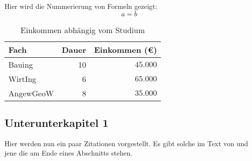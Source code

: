 	Hier wird die Nummerierung von Formeln gezeigt:
	\begin{equation}
		a=b
	\end{equation}
	
	\begin{table}
		\caption{Einkommen abhängig vom Studium}
		\label{tbl:testtest}
		\centering
		\begin{tabular}{lrr} 
			\toprule
			Fach & Dauer & Einkommen (€)\\ 
			\midrule 
			Bauing & 10 & $45.000$ \\
			WirtIng & 6 & $65.000$ \\
			AngewGeoW & 8 & $35.000$\\ 
			\bottomrule
		\end{tabular}
	\end{table}


\subsection{Unterunterkapitel 1}
	Hier werden nun ein paar Zitationen vorgestellt. Es gibt solche im Text von \textcite{alam_effects_2014} und jene die am Ende eines Abschnitts stehen. \parencites{bailey_technology_2018}{alam_effects_2014}{dassault_systemes_abaqus_2017}{dassault_systemes_abaqus_2019}
	
	\blindtext \parencite{alireza_hassanzadegan_thermomechanical_2012}